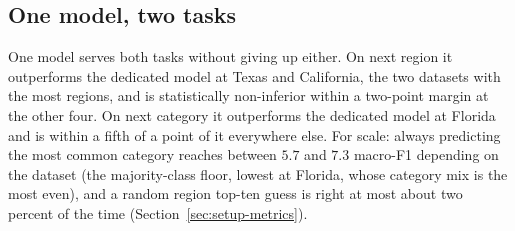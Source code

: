 \subsection{One model, two tasks}
\label{sec:results-part2}
One model serves both tasks without giving up either. On next region it
outperforms the dedicated model at Texas and California, the two datasets with the most regions,
and is statistically non-inferior within a two-point margin at the other four. On next category it
outperforms the dedicated model at Florida and is within a fifth of a point of it everywhere else.
For scale: always predicting the most common category reaches between $5.7$
and $7.3$ macro-F1 depending on the dataset (the majority-class floor, lowest at Florida, whose
category mix is the most even), and a random region top-ten guess
is right at most about two percent of the time (Section~\ref{sec:setup-metrics}).

